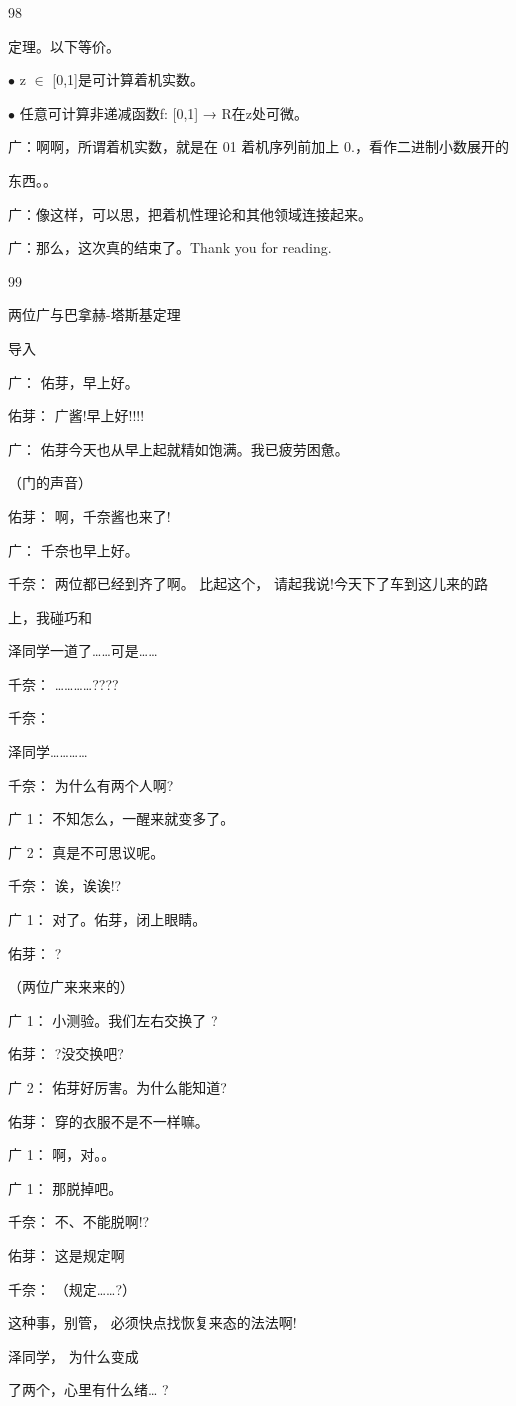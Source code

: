 98\par
定理。以下等价。\par
$\bullet$ z $\in$ [0,1]是可计算着机实数。\par
$\bullet$ 任意可计算非递减函数f: [0,1] → R在z处可微。\par
广：啊啊，所谓着机实数，就是在 01 着机序列前加上 0.，看作二进制小数展开的\par
东西。。\par
广：像这样，可以思，把着机性理论和其他领域连接起来。\par
广：那么，这次真的结束了。Thank you for reading.\par

99\par
两位广与巴拿赫-塔斯基定理\par
导入\par
广： 佑芽，早上好。\par
佑芽： 广酱!早上好!!!!\par
广： 佑芽今天也从早上起就精如饱满。我已疲劳困惫。\par
（门的声音）\par
佑芽： 啊，千奈酱也来了!\par
广： 千奈也早上好。\par
千奈： 两位都已经到齐了啊。 比起这个， 请起我说!今天下了车到这儿来的路\par
上，我碰巧和\par
泽同学一道了……可是……\par
千奈： …………????\par
千奈：\par
泽同学…………\par
千奈： 为什么有两个人啊?\par
广 1： 不知怎么，一醒来就变多了。\par
广 2： 真是不可思议呢。\par
千奈： 诶，诶诶!?\par
广 1： 对了。佑芽，闭上眼睛。\par
佑芽： ?\par
（两位广来来来的）\par
广 1： 小测验。我们左右交换了 ?\par
佑芽： ?没交换吧?\par
广 2： 佑芽好厉害。为什么能知道?\par
佑芽： 穿的衣服不是不一样嘛。\par
广 1： 啊，对。。\par
广 1： 那脱掉吧。\par
千奈： 不、不能脱啊!?\par
佑芽： 这是规定啊\par
千奈： （规定……?）\par
这种事，别管， 必须快点找恢复来态的法法啊!\par
泽同学， 为什么变成\par
了两个，心里有什么绪… ?\par

